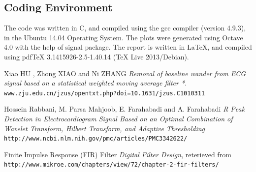 \documentclass{article}
\begin{document}
\subsection{Coding Environment}
The code was written in C, and compiled using the gcc compiler (version 4.9.3), in the
Ubuntu 14.04 Operating System. The plots were generated using Octave 4.0 with the help of signal package. The report 
is written in \LaTeX, and compiled using pdfTeX 3.1415926-2.5-1.40.14 (TeX Live 2013/Debian).

\begin{thebibliography}{9}
Xiao HU , Zhong XIAO and Ni ZHANG 
\textit{Removal of baseline wander from ECG signal based on a statistical weighted moving average filter *}. 
\\\texttt{www.zju.edu.cn/jzus/opentxt.php?doi=10.1631/jzus.C1010311}
 
 Hossein Rabbani, M. Parsa Mahjoob, E. Farahabadi and A. Farahabadi
 \textit{R Peak Detection in Electrocardiogram Signal Based on an Optimal Combination of Wavelet Transform, Hilbert Transform, and Adaptive Thresholding}
 \\\texttt{http://www.ncbi.nlm.nih.gov/pmc/articles/PMC3342622/}

 Finite Impulse Response (FIR) Filter \textit{Digital Filter Design}, reterieved from
 \texttt{http://www.mikroe.com/chapters/view/72/chapter-2-fir-filters/}
 \end{thebibliography}
\end{document}
